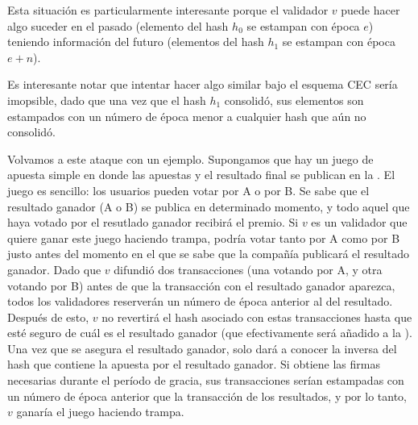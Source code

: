 Esta situación es particularmente interesante porque el validador $v$ puede hacer algo
suceder en el pasado (elemento del hash $h_0$ se estampan con época $e$) teniendo información
del futuro (elementos del hash $h_1$ se estampan con época $e+n$). 
%

Es interesante notar que intentar hacer algo similar bajo el esquema CEC sería imopsible, dado
que una vez que el hash $h_1$ consolidó, sus elementos son estampados con un número de época menor
a cualquier hash que aún no consolidó.
%

Volvamos a este ataque con un ejemplo. Supongamos que hay un juego de apuesta simple en donde
las apuestas y el resultado final se publican en la \hashchain. El juego es sencillo: los usuarios
pueden votar por A o por B. Se sabe que el resultado ganador (A o B) se publica en determinado momento,
y todo aquel que haya votado por el resutlado ganador recibirá el premio.
%
Si $v$ es un validador que quiere ganar este juego haciendo trampa, podría votar tanto por A
como por B justo antes del momento en el que se sabe que la compañía publicará el resultado ganador.
%
Dado que $v$ difundió dos transacciones (una votando por A, y otra votando por B) antes de que la
transacción con el resultado ganador aparezca, todos los validadores reserverán un número de época
anterior al del resultado. Después de esto, $v$ no revertirá el hash asociado con estas transacciones
hasta que esté seguro de cuál es el resultado ganador (que efectivamente será añadido a la \hashchain).
%
Una vez que se asegura el resultado ganador, solo dará a conocer la inversa del hash que contiene la apuesta
por el resultado ganador. Si obtiene las firmas necesarias durante el período de gracia,
sus transacciones serían estampadas con un número de época anterior que la transacción de los resultados,
y por lo tanto, $v$ ganaría el juego haciendo trampa.

